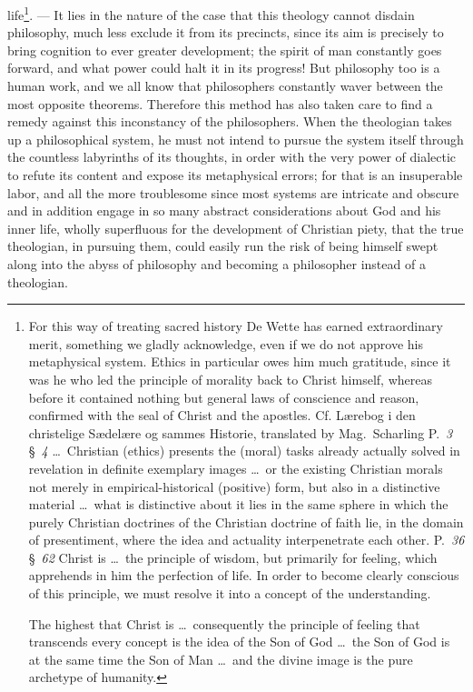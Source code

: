 \documentclass[12pt]{book}
\newcommand{\opage}[1]{\marginnote{\footnotesize\textit{[#1]}}}
\begin{document}
life\footnote{For this way of treating sacred history De Wette has earned
extraordinary merit, something we gladly acknowledge, even if we do not approve
his metaphysical system. Ethics in particular owes him much gratitude, since it
was he who led the principle of morality back to Christ himself, whereas before
it contained nothing but general laws of conscience and reason, confirmed with
the seal of Christ and the apostles. Cf. Lærebog i den christelige Sædelære og
sammes Historie, translated by Mag.\ Scharling P.~\textit{3} §~\textit{4}
\ldots\ Christian (ethics) presents the (moral) tasks already actually solved
in revelation in definite exemplary images \ldots\ or the existing Christian
morals not merely in empirical-historical (positive) form, but also in a
distinctive material \ldots\ what is distinctive about it lies in the same
sphere in which the purely Christian doctrines of the Christian doctrine of
faith lie, in the domain of presentiment, where the idea and actuality
interpenetrate each other. P.~\textit{36} §~\textit{62} Christ is \ldots\ the
principle of wisdom, but primarily for feeling, which apprehends in him the
perfection of life. In order to become clearly conscious of this principle, we
must resolve it into a concept of the understanding.

The highest that Christ is \ldots\ consequently the principle of feeling that
transcends every concept is the idea of the Son of God \ldots\ the Son of God
is at the same time the Son of Man \ldots\ and the divine image is the pure
archetype of humanity.}. --- It lies in the nature of the case that
\opage{103} this theology cannot disdain philosophy, much less exclude it from
its precincts, since its aim is precisely to bring cognition to ever greater
development; the spirit of man constantly goes forward, and what power could
halt it in its progress! But philosophy too is a human work, and we all know
that philosophers constantly waver between the most opposite theorems.
Therefore this method has also taken care to find a remedy against this
inconstancy of the philosophers. When the theologian takes up a philosophical
system, he must not intend to pursue the system itself through the countless
labyrinths of its thoughts, in order with the very power of dialectic to refute
its content and expose its metaphysical errors; for that is an insuperable
labor, and all the more troublesome since most systems are intricate and
obscure and in addition engage in so many abstract considerations about God
and his inner life, wholly superfluous for the development of Christian piety,
that the true theologian, in pursuing them, could easily run the risk of being
himself swept along into the abyss of philosophy and becoming a philosopher
instead of a theologian.
\end{document}
